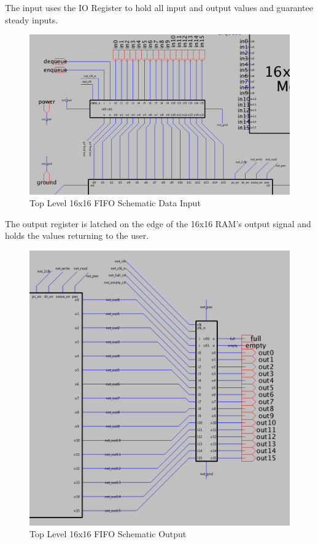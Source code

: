 \documentclass[a4paper]{article}
\begin{document}
The input uses the IO Register to hold all input and output values and guarantee steady inputs.

\begin{figure}[H]
	\centering
	\includegraphics[scale=0.4]{topLevelSchematicTop}
	\caption{Top Level 16x16 FIFO Schematic Data Input}
	\label{fig:topLevelSchematicTop}
\end{figure}

The output register is latched on the edge of the 16x16 RAM's output signal and holds the values returning to the user.

\begin{figure}[H]
	\centering
	\includegraphics[scale=0.4]{topLevelSchematicRight}
	\caption{Top Level 16x16 FIFO Schematic Output}
	\label{fig:topLevelSchematicRight}
\end{figure}
\end{document}
